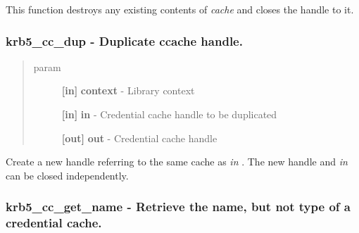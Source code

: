 \documentclass[letterpaper,10pt,english]{sphinxmanual}
\begin{document}
This function destroys any existing contents of \emph{cache} and closes the handle to it.


\subsubsection{krb5\_cc\_dup -  Duplicate ccache handle.}
\label{appdev/refs/api/krb5_cc_dup:krb5-cc-dup-duplicate-ccache-handle}\label{appdev/refs/api/krb5_cc_dup::doc}

\begin{fulllineitems}
\label{appdev/refs/api/krb5_cc_dup:krb5_cc_dup}
\end{fulllineitems}

\begin{quote}\begin{description}
\item[{param}] \leavevmode
\textbf{{[}in{]}} \textbf{context} - Library context

\textbf{{[}in{]}} \textbf{in} - Credential cache handle to be duplicated

\textbf{{[}out{]}} \textbf{out} - Credential cache handle

\end{description}\end{quote}

Create a new handle referring to the same cache as \emph{in} . The new handle and \emph{in} can be closed independently.


\subsubsection{krb5\_cc\_get\_name -  Retrieve the name, but not type of a credential cache.}
\label{appdev/refs/api/krb5_cc_get_name::doc}\label{appdev/refs/api/krb5_cc_get_name:krb5-cc-get-name-retrieve-the-name-but-not-type-of-a-credential-cache}

\begin{fulllineitems}
\label{appdev/refs/api/krb5_cc_get_name:krb5_cc_get_name}
\end{fulllineitems}
\end{document}
